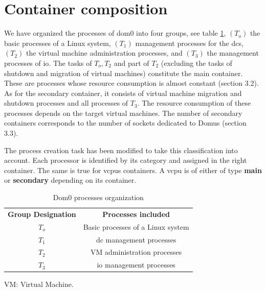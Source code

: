 \newpage 
\section{Container composition}
We have organized the processes of dom0 into four groups, see table \ref{table:group_dom0}, $(T_o)$ the basic processes of a Linux system, $(T_1)$ management processes for the \glspl{dc}, $(T_2)$ the virtual machine administration processes, and $(T_3)$ the management processes of \acrshort{io}. The tasks of $T_o, T_2 $ and part of $T_2$ (excluding the tasks of shutdown and migration of virtual machines) constitute the main container. These are processes whose resource consumption is almost constant (section 3.2). As for the secondary container, it consists of virtual machine migration and shutdown processes and all processes of $T_3$. The resource consumption of these processes depends on the target virtual machines. The number of secondary containers corresponds to the number of sockets dedicated to Domus (section 3.3).

The process creation task has been modified to take this classification into account. Each processor is identified by its category and assigned in the right container. The same is true for \acrshort{vcpu}s containers. A \acrshort{vcpu} is of either of type \textbf{main} or \textbf{secondary} depending on its container. 

\begin{table}[!h]
    \centering 
     \caption{Dom0 processes organization}
    \begin{tabular}{cc}
        \toprule
        \textbf{Group Designation} & \textbf{Processes included} \\
             \myrowcolour
        $T_o$ & Basic processes of a Linux system \\
        $T_1$ & \gls{dc} management processes\\
             \myrowcolour
        $T_2$ & VM administration processes \\
        $T_3$ & \acrshort{io} management processes \\
        \bottomrule
    \end{tabular}
    \label{table:group_dom0}
\end{table}

VM: Virtual Machine.


